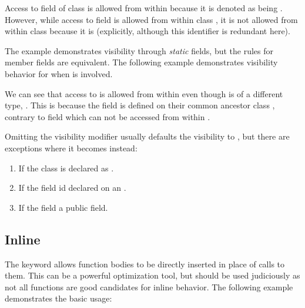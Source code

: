 \documentclass{haxe}
\begin{document}
Access to field  of class  is allowed from within  because it is denoted as being . However, while access to field  is allowed from within class , it is not allowed from within class  because it is  (explicitly, although this identifier is redundant here).

The example demonstrates visibility through \emph{static} fields, but the rules for member fields are equivalent. The following example demonstrates visibility behavior for when  is involved.


We can see that access to  is allowed from within  even though  is of a different type, . This is because the field is defined on their common ancestor class , contrary to field  which can not be accessed from within .

Omitting the visibility modifier usually defaults the visibility to , but there are exceptions where it becomes  instead:

\begin{enumerate}
	\item If the class is declared as .
	\item If the field id declared on an .
	\item If the field  a public field.
\end{enumerate}


\subsection{Inline}
\label{class-field-inline}

The  keyword allows function bodies to be directly inserted in place of calls to them. This can be a powerful optimization tool, but should be used judiciously as not all functions are good candidates for inline behavior. The following example demonstrates the basic usage:
\end{document}
